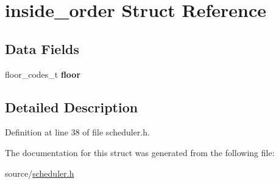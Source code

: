 \hypertarget{structinside__order}{}\section{inside\+\_\+order Struct Reference}
\label{structinside__order}
\subsection*{Data Fields}
\begin{DoxyCompactItemize}
\item 
floor\+\_\+codes\+\_\+t {\bfseries floor}\hypertarget{structinside__order_a5f816e91e84a8bd27ac2a179c43691dc}{}\label{structinside__order_a5f816e91e84a8bd27ac2a179c43691dc}

\end{DoxyCompactItemize}


\subsection{Detailed Description}


Definition at line 38 of file scheduler.\+h.



The documentation for this struct was generated from the following file\+:\begin{DoxyCompactItemize}
\item 
source/\hyperlink{scheduler_8h}{scheduler.\+h}\end{DoxyCompactItemize}
